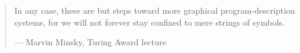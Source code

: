 \documentclass[preprint,9pt]{sigplanconf}
\begin{document}

\begin{quote}
In any case, these are but steps toward more graphical program-description
systems, for we will not forever stay confined to mere strings of symbols.

--- Marvin Minsky, Turing Award lecture
\end{quote}%
\clearpage




\end{document}
